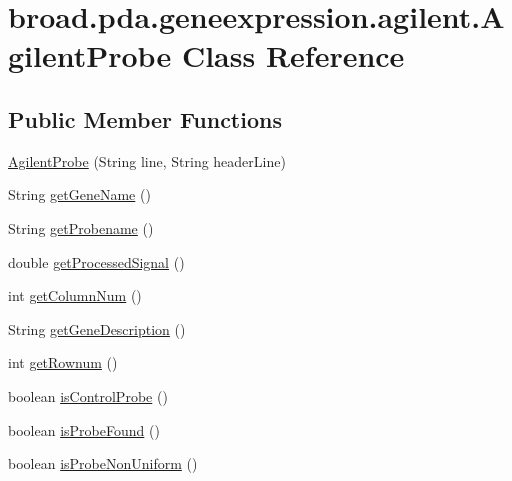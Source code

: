 \hypertarget{classbroad_1_1pda_1_1geneexpression_1_1agilent_1_1_agilent_probe}{\section{broad.\+pda.\+geneexpression.\+agilent.\+Agilent\+Probe Class Reference}
\label{classbroad_1_1pda_1_1geneexpression_1_1agilent_1_1_agilent_probe}
}
\subsection*{Public Member Functions}
\begin{DoxyCompactItemize}
\item 
\hyperlink{classbroad_1_1pda_1_1geneexpression_1_1agilent_1_1_agilent_probe_a35c011ded839cab197bc6e8654b334ff}{Agilent\+Probe} (String line, String header\+Line)
\item 
String \hyperlink{classbroad_1_1pda_1_1geneexpression_1_1agilent_1_1_agilent_probe_ac8356167b52231358f3df6955b98fc1a}{get\+Gene\+Name} ()
\item 
String \hyperlink{classbroad_1_1pda_1_1geneexpression_1_1agilent_1_1_agilent_probe_aa2762410b7558415f57027407bd3b664}{get\+Probename} ()
\item 
double \hyperlink{classbroad_1_1pda_1_1geneexpression_1_1agilent_1_1_agilent_probe_a68212359aba098533a6e6896f0e62eb7}{get\+Processed\+Signal} ()
\item 
int \hyperlink{classbroad_1_1pda_1_1geneexpression_1_1agilent_1_1_agilent_probe_a84c1c947797737f342319467ea841253}{get\+Column\+Num} ()
\item 
String \hyperlink{classbroad_1_1pda_1_1geneexpression_1_1agilent_1_1_agilent_probe_a7e391d1c45c21de7823a5d4d6a7ca8e6}{get\+Gene\+Description} ()
\item 
int \hyperlink{classbroad_1_1pda_1_1geneexpression_1_1agilent_1_1_agilent_probe_af6e945427031897c3c5e8e56d37f3c22}{get\+Rownum} ()
\item 
boolean \hyperlink{classbroad_1_1pda_1_1geneexpression_1_1agilent_1_1_agilent_probe_af0fd5c8c29a0217733387a1128f5a17d}{is\+Control\+Probe} ()
\item 
boolean \hyperlink{classbroad_1_1pda_1_1geneexpression_1_1agilent_1_1_agilent_probe_ae13421376722c2a6cdb6fd7c3c5085bc}{is\+Probe\+Found} ()
\item 
boolean \hyperlink{classbroad_1_1pda_1_1geneexpression_1_1agilent_1_1_agilent_probe_aea7bd1ea385e66fa6cf6d4143406992b}{is\+Probe\+Non\+Uniform} ()

\end{DoxyCompactItemize}
